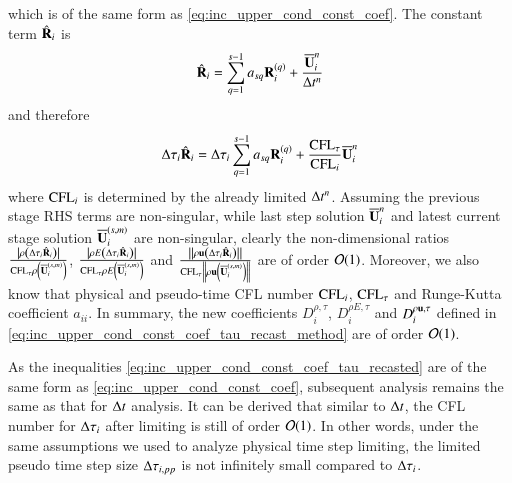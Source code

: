 which is of the same form as \eqref{eq:inc_upper_cond_const_coef}.
The constant term  $\hat{\mathbf{R}}_i$ is
\begin{equation}
        \hat{\mathbf{R}}_i  = \sum_{q=1}^{s-1} a_{sq} \mathbf{R}_i^{\left(q\right)} +
    \dfrac{\overline{\mathbf{U}}_i^{n}}{\mathrm\Delta t^n} 
\end{equation}
and therefore
\begin{equation}
        \mathrm\Delta\tau_i\hat{\mathbf{R}}_i  = \mathrm\Delta\tau_i\sum_{q=1}^{s-1} a_{sq} \mathbf{R}_i^{\left(q\right)} +
    \dfrac{\text{CFL}_\tau}{\text{CFL}_i}\overline{\mathbf{U}}_i^{n} 
\end{equation}
where $\text{CFL}_i$ is determined by the already limited $\mathrm\Delta t^n$.
Assuming the previous stage RHS terms are non-singular, while 
last step solution $\overline{\mathbf{U}}_i^n$ and 
latest current stage solution $\overline{\mathbf{U}}_i^{\left(s,m\right)}$ are non-singular, clearly the 
non-dimensional ratios 
$\frac{\left| \rho\left(\mathrm\Delta\tau_i \hat{\mathbf{R}}_i\right) \right|}
{ \text{CFL}_\tau\rho\left( \overline{\mathbf{U}}_i^{\left(s,m\right)} \right)}$,
$\frac{\left| \rho E\left(\mathrm\Delta\tau_i \hat{\mathbf{R}}_i\right) \right|}
{ \text{CFL}_\tau\rho E\left( \overline{\mathbf{U}}_i^{\left(s,m\right)} \right)}$ and 
$\frac{\left\|\rho\mathbf{u}\left(\mathrm\Delta\tau_i \hat{\mathbf{R}}_i\right) \right\|}
{ \text{CFL}_\tau\left\|\rho \mathbf{u}\left( \overline{\mathbf{U}}_i^{\left(s,m\right)} \right)\right\|}$
are of order $\mathcal{O}(1)$. 
Moreover, we also know that physical and pseudo-time CFL number $\text{CFL}_i$, $\text{CFL}_\tau$ and 
Runge-Kutta coefficient $a_{ii}$.
In summary, the new coefficients $D^{\rho,\tau}_i$, $D^{\rho E,\tau}_i$ 
and $D^{\rho \mathbf{u},\tau}_i$ defined in \eqref{eq:inc_upper_cond_const_coef_tau_recast_method}
are of order $\mathcal{O}(1)$. 

As the inequalities \eqref{eq:inc_upper_cond_const_coef_tau_recasted}
are of the same form as \eqref{eq:inc_upper_cond_const_coef}, 
subsequent analysis remains the same as that for $\mathrm\Delta t$ analysis. 
It can be derived that similar to $\mathrm\Delta t$, the CFL number 
for $\mathrm\Delta \tau _i$ after limiting is still of order $\mathcal{O}(1)$.
In other words,
under the same assumptions we used to analyze physical time step limiting,
the limited pseudo time step size $\mathrm\Delta \tau_{i,pp}$ is not infinitely small compared to $\mathrm\Delta \tau_i$.


